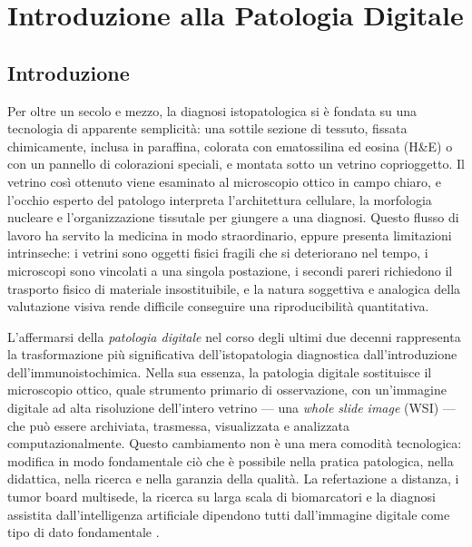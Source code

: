 
\chapter{Introduzione alla Patologia Digitale}
\label{ch:1}

\section{Introduzione}

Per oltre un secolo e mezzo, la diagnosi istopatologica si è fondata su una tecnologia di apparente semplicità: una sottile sezione di tessuto, fissata chimicamente, inclusa in paraffina, colorata con ematossilina ed eosina (H\&E) o con un pannello di colorazioni speciali, e montata sotto un vetrino coprioggetto. Il vetrino così ottenuto viene esaminato al microscopio ottico in campo chiaro, e l'occhio esperto del patologo interpreta l'architettura cellulare, la morfologia nucleare e l'organizzazione tissutale per giungere a una diagnosi. Questo flusso di lavoro ha servito la medicina in modo straordinario, eppure presenta limitazioni intrinseche: i vetrini sono oggetti fisici fragili che si deteriorano nel tempo, i microscopi sono vincolati a una singola postazione, i secondi pareri richiedono il trasporto fisico di materiale insostituibile, e la natura soggettiva e analogica della valutazione visiva rende difficile conseguire una riproducibilità quantitativa.

L'affermarsi della \emph{patologia digitale} nel corso degli ultimi due decenni rappresenta la trasformazione più significativa dell'istopatologia diagnostica dall'introduzione dell'immunoistochimica. Nella sua essenza, la patologia digitale sostituisce il microscopio ottico, quale strumento primario di osservazione, con un'immagine digitale ad alta risoluzione dell'intero vetrino --- una \emph{whole slide image} (WSI) --- che può essere archiviata, trasmessa, visualizzata e analizzata computazionalmente. Questo cambiamento non è una mera comodità tecnologica: modifica in modo fondamentale ciò che è possibile nella pratica patologica, nella didattica, nella ricerca e nella garanzia della qualità. La refertazione a distanza, i tumor board multisede, la ricerca su larga scala di biomarcatori e la diagnosi assistita dall'intelligenza artificiale dipendono tutti dall'immagine digitale come tipo di dato fondamentale \cite{bera2019}.

